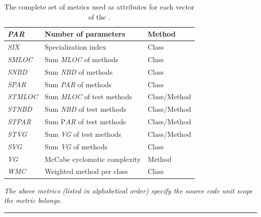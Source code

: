 \begin{table}[!tb]
\begin{threeparttable}
\begin{tabular}{|l|l|l|}
      \hline \emph{PAR} & Number of parameters & Method \\
      \hline \emph{SIX} & Specialization index & Class \\
      \hline \emph{SMLOC} & Sum \emph{MLOC} of methods & Class \\
      \hline \emph{SNBD} & Sum \emph{NBD} of methods & Class \\
      \hline \emph{SPAR} & Sum \emph{PAR} of methods & Class \\
      \hline \emph{STMLOC} & Sum \emph{MLOC} of test methods & Class/Method \\
      \hline \emph{STNBD} & Sum \emph{NBD} of test methods & Class/Method \\
      \hline \emph{STPAR} & Sum P\emph{AR} of test methods & Class/Method \\
      \hline \emph{STVG} & Sum \emph{VG} of test methods & Class/Method \\
      \hline \emph{SVG} & Sum \emph{VG} of methods & Class \\
      \hline \emph{VG} & McCabe cyclomatic complexity & Method \\
      \hline \emph{WMC} & Weighted method per class & Class \\
      \hline
    \end{tabular}
  \end{threeparttable}
  \caption{The complete set of metrics used as attributes for each vector of the .}
  \vspace{1mm}
  \footnotesize{\emph{The above metrics (listed in alphabetical order) specify the source code unit scope the metric belongs.}}
  \vspace{2mm}
  \hrule
  \label{tab:metrics}
\end{table}

